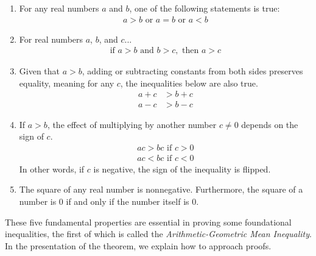 \documentclass[twoside]{report}
\begin{document}
\begin{enumerate}
	\item For any real numbers $a$ and $b$, one of the following statements is true:
		\begin{align*}
			a > b \text{ or } a = b \text{ or } a < b
		\end{align*}
	\item For real numbers $a$, $b$, and $c$...
		\begin{align*}
			\text{if } a > b \text{ and } b > c, \text{ then } a > c 
		\end{align*}
	\item Given that $a > b$, adding or subtracting constants from both sides preserves equality, meaning for any $c$, the inequalities below are also true.
		\begin{align*}
			a + c &> b + c \\
			a - c &> b - c
		\end{align*}
	\item If $a > b$, the effect of multiplying by another number $c \neq 0$ depends on the sign of $c$.
		\begin{align*}
			ac > bc \text{ if } c > 0 \\
			ac < bc \text{ if } c < 0
		\end{align*}
		In other words, if $c$ is negative, the sign of the inequality is flipped.
	\item The square of any real number is nonnegative. Furthermore, the square of a number is 0 if and only if the number itself is 0.
\end{enumerate}

These five fundamental properties are essential in proving some foundational inequalities, the first of which is called the \emph{Arithmetic-Geometric Mean Inequality}. In the presentation of the theorem, we explain how to approach proofs. \\
\end{document}

